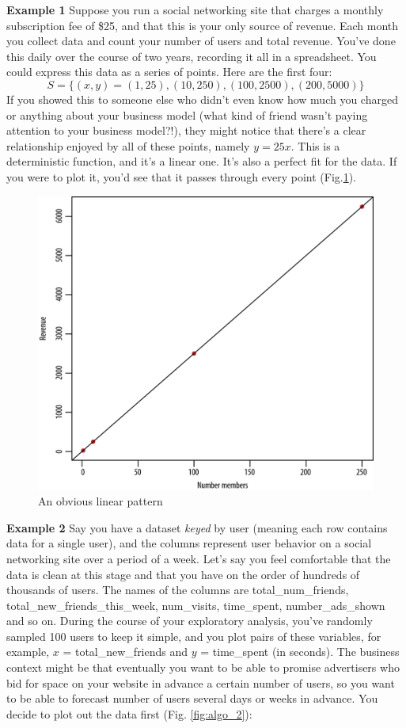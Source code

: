 \textbf{Example 1} Suppose you run a social networking site that charges a monthly subscription fee of \$25, and that this is your only source of revenue. Each month you collect data and count your number of users and total revenue. You’ve done this daily over the course of two years, recording it all in a spreadsheet. You could express this data as a series of points. Here are the first four:
$$
    S=\{(x, y)=(1,25),(10,250),(100,2500),(200,5000)\}
$$
If you showed this to someone else who didn't even know how much you charged or anything about your business model (what kind of friend wasn't paying attention to your business model?!), they might notice that there's a clear relationship enjoyed by all of these points, namely \(y=25x\). This is a deterministic function, and it’s a linear one. It's also a perfect fit for the data. If you were to plot it, you'd see that it passes through every point (Fig.\ref{fig:algo_1}).

\begin{figure}[H]
    \centering
    \includegraphics[width=0.7\linewidth]{imgs/fundamental_algo/algo_1.png}
    \caption{An obvious linear pattern}
    \label{fig:algo_1}
\end{figure}

\textbf{Example 2} Say you have a dataset \textit{keyed} by user (meaning each row contains data for a single user), and the columns represent user behavior on a social networking site over a period of a week. Let's say you feel comfortable that the data is clean at this stage and that you have on the order of hundreds of thousands of users. The names of the columns are total\_num\_friends, total\_new\_friends\_this\_week, num\_visits, time\_spent, number\_ads\_shown and so on. During the course of your exploratory analysis, you've randomly sampled 100 users to keep it simple, and you plot pairs of these variables, for example, \(x\) = total\_new\_friends and \(y\) = time\_spent (in seconds). The business context might be that eventually you want to be able to promise advertisers who bid for space on your website in advance a certain number of users, so you want to be able to forecast number of users several days or weeks in advance. You decide to plot out the data first (Fig. \ref{fig:algo_2}):

